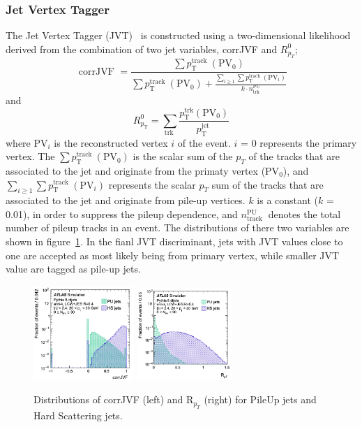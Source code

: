 \subsubsection{Jet Vertex Tagger}
The Jet Vertex Tagger (JVT)~\cite{PERF-2014-03} is constructed using a two-dimensional likelihood derived from the combination of two jet variables, corrJVF and $R^0_{p_T}$;
\begin{equation}
\text { corrJVF }=\frac{\sum p_{\mathrm{T}}^{\text {track }}\left(\mathrm{PV}_0\right)}{\sum p_{\mathrm{T}}^{\text {track }}\left(\mathrm{PV}_0\right)+\frac{\sum_{i \geq 1} \sum p_{\mathrm{T}}^{\text {track }}\left(\mathrm{PV}_i\right)}{k \cdot n_{\mathrm{trk}}^{\mathrm{PU}}}}
\end{equation}
and
\begin{equation}
R_{p_{\mathrm{T}}}^0=\sum_{\text {trk }} \frac{p_{\mathrm{T}}^{\mathrm{trk}}\left(\mathrm{PV}_0\right)}{p_{\mathrm{T}}^{\text {jet }}}
\end{equation}
where PV$_i$ is the reconstructed vertex $i$ of the event. $i$ = 0 represents the primary vertex. The $\sum p_{\mathrm{T}}^{\text {track }}\left(\mathrm{PV}_0\right)$ is the scalar sum of the $p_T$ of the tracks that are associated to the jet and originate from the primaty vertex (PV$_0$), and $\sum_{i \geq 1} \sum p_{\mathrm{T}}^{\text {track }}\left(\mathrm{PV}_i\right)$ represents the scalar $p_T$ sum of the tracks that are associated to the jet and originate from pile-up vertices. $k$ is a constant ($k$ = 0.01), in order to suppress the pileup dependence, and $n_{\text {track }}^{\mathrm{PU}}$ denotes the total number of pileup tracks in an event. The distributions of there two variables are shown in figure~\ref{fig:JVT}. In the fianl JVT discriminant, jets with JVT values close to one are accepted as most likely being from primary vertex, while smaller JVT value are tagged as pile-up jets.
\begin{figure}[tbp]
    \begin{center}
    \includegraphics[width=0.34\textwidth,keepaspectratio]{figures/Reconstruction/corrJVF}
    \includegraphics[width=0.32\textwidth,keepaspectratio]{figures/Reconstruction/RPT}
    \caption{
    Distributions of corrJVF (left) and R$_{p_{T}}$ (right) for PileUp jets and Hard Scattering jets. \cite{PERF-2014-03}
    }
    \label{fig:JVT}
    \end{center}
\end{figure}
